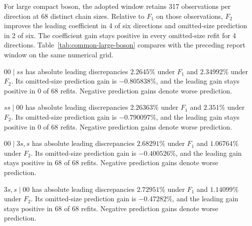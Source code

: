 For large compact boson, the adopted window retains 317 observations per direction at 68 distinct chain sizes. Relative to $F_1$ on those observations, $F_2$ improves the leading coefficient in 4 of six directions and omitted-size prediction in 2 of six. The coefficient gain stays positive in every omitted-size refit for 4 directions. Table~\ref{tab:common-large-boson} compares with the preceding report window on the same numerical grid.

$00\mid ss$ has absolute leading discrepancies $2.2645\%$ under $F_1$ and $2.34992\%$ under $F_2$. Its omitted-size prediction gain is $-0.805838\%$, and the leading gain stays positive in 0 of 68 refits. Negative prediction gains denote worse prediction.

$ss\mid 00$ has absolute leading discrepancies $2.26363\%$ under $F_1$ and $2.351\%$ under $F_2$. Its omitted-size prediction gain is $-0.790097\%$, and the leading gain stays positive in 0 of 68 refits. Negative prediction gains denote worse prediction.

$00\mid 3s,s$ has absolute leading discrepancies $2.68291\%$ under $F_1$ and $1.06764\%$ under $F_2$. Its omitted-size prediction gain is $-0.400526\%$, and the leading gain stays positive in 68 of 68 refits. Negative prediction gains denote worse prediction.

$3s,s\mid 00$ has absolute leading discrepancies $2.72951\%$ under $F_1$ and $1.14099\%$ under $F_2$. Its omitted-size prediction gain is $-0.47282\%$, and the leading gain stays positive in 68 of 68 refits. Negative prediction gains denote worse prediction.
